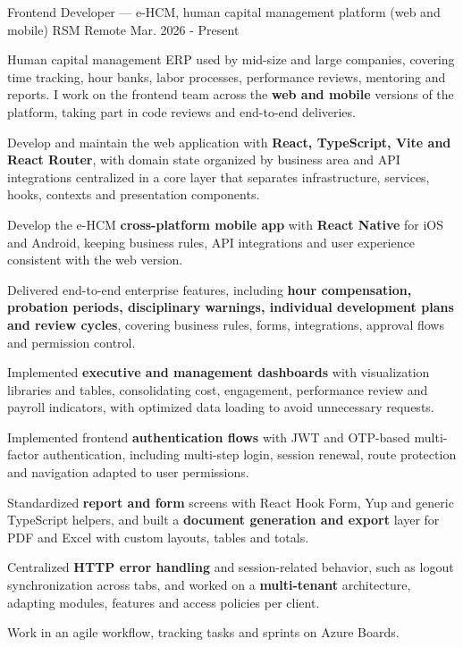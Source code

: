\begin{cventries}
  \cventry
    {Frontend Developer --- e-HCM, human capital management platform (web and mobile)} %
    {RSM} %
    {Remote} %
    {Mar. 2026 - Present} %
    {
      \begin{cvitems} %
        \item {Human capital management ERP used by mid-size and large companies, covering time tracking, hour banks, labor processes, performance reviews, mentoring and reports. I work on the frontend team across the \textbf{web and mobile} versions of the platform, taking part in code reviews and end-to-end deliveries.}
        \item {Develop and maintain the web application with \textbf{React, TypeScript, Vite and React Router}, with domain state organized by business area and API integrations centralized in a core layer that separates infrastructure, services, hooks, contexts and presentation components.}
        \item {Develop the e-HCM \textbf{cross-platform mobile app} with \textbf{React Native} for iOS and Android, keeping business rules, API integrations and user experience consistent with the web version.}
        \item {Delivered end-to-end enterprise features, including \textbf{hour compensation, probation periods, disciplinary warnings, individual development plans and review cycles}, covering business rules, forms, integrations, approval flows and permission control.}
        \item {Implemented \textbf{executive and management dashboards} with visualization libraries and tables, consolidating cost, engagement, performance review and payroll indicators, with optimized data loading to avoid unnecessary requests.}
        \item {Implemented frontend \textbf{authentication flows} with JWT and OTP-based multi-factor authentication, including multi-step login, session renewal, route protection and navigation adapted to user permissions.}
        \item {Standardized \textbf{report and form} screens with React Hook Form, Yup and generic TypeScript helpers, and built a \textbf{document generation and export} layer for PDF and Excel with custom layouts, tables and totals.}
        \item {Centralized \textbf{HTTP error handling} and session-related behavior, such as logout synchronization across tabs, and worked on a \textbf{multi-tenant} architecture, adapting modules, features and access policies per client.}
        \item {Work in an agile workflow, tracking tasks and sprints on Azure Boards.}
      \end{cvitems}
    }


\end{cventries}

